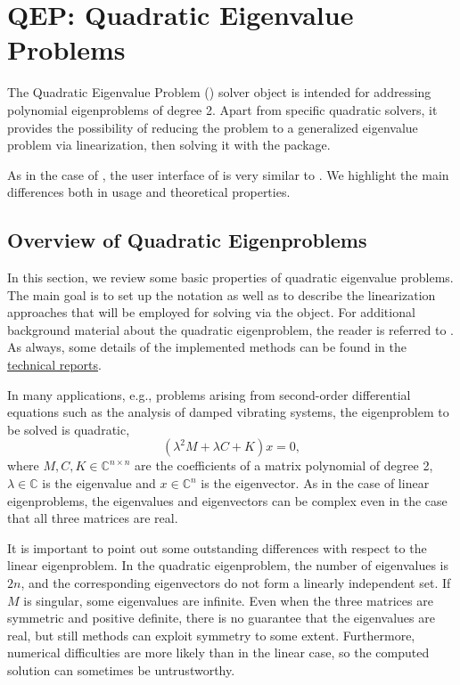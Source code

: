 \chapter{\label{cap:qep}QEP: Quadratic Eigenvalue Problems}

\noindent The Quadratic Eigenvalue Problem () solver object is intended for addressing polynomial eigenproblems of degree 2. Apart from specific quadratic solvers, it provides the possibility of reducing the problem to a generalized eigenvalue problem via linearization, then solving it with the  package.

As in the case of , the user interface of  is very similar to . We highlight the main differences both in usage and theoretical properties.

\section{\label{sec:qep}Overview of Quadratic Eigenproblems}

In this section, we review some basic properties of quadratic eigenvalue problems. The main goal is to set up the notation as well as to describe the linearization approaches that will be employed for solving via the  object. For additional background material about the quadratic eigenproblem, the reader is referred to \citep{Tisseur:2001:QEP}. As always, some details of the implemented methods can be found in the \slepc \hyperlink{str}{technical reports}.

In many applications, e.g., problems arising from second-order differential equations such as the analysis of damped vibrating systems, the eigenproblem to be solved is quadratic,
\begin{equation}
(\lambda^2M+\lambda C+K)x=0,\label{eq:eigquad}
\end{equation}
where $M,C,K\in\mathbb{C}^{n\times n}$ are the coefficients of a matrix polynomial of degree 2, $\lambda\in\mathbb{C}$ is the eigenvalue and $x\in\mathbb{C}^n$ is the eigenvector. As in the case of linear eigenproblems, the eigenvalues and eigenvectors can be complex even in the case that all three matrices are real.

It is important to point out some outstanding differences with respect to the linear eigenproblem. In the quadratic eigenproblem, the number of eigenvalues is $2n$, and the corresponding eigenvectors do not form a linearly independent set. If $M$ is singular, some eigenvalues are infinite. Even when the three matrices are symmetric and positive definite, there is no guarantee that the eigenvalues are real, but still methods can exploit symmetry to some extent. Furthermore, numerical difficulties are more likely than in the linear case, so the computed solution can sometimes be untrustworthy.

